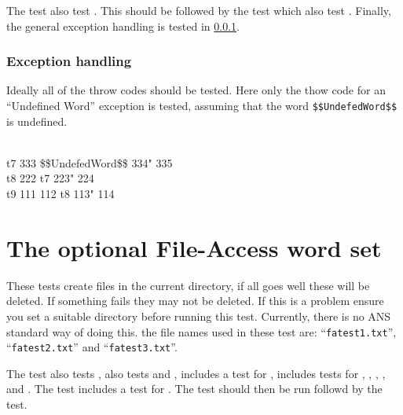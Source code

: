 The test  also test .  This should
be followed by the test  which also test
.  Finally, the general exception handling is tested in
\ref{test:throw}.

\setcounter{subsection}{3}
\setcounter{subsubsection}{5}
\subsubsection{Exception handling}
\label{test:throw}

Ideally all of the throw codes should be tested.  Here only the
thow code for an ``Undefined Word'' exception is tested, assuming
that the word \texttt{\$\$UndefedWord\$\$} is undefined.

\begin{tt}
 \\
\word{:} t7  333 \$\$UndefedWord\$\$ 334"  335 \word{;} \\
\word{:} t8  222 t7 223"  224 \word{;} \\
\word{:} t9  111 112 t8 113"  114 \word{;}
\end{tt}






\section{The optional File-Access word set} %

These tests create files in the current directory, if all goes well
these will be deleted.  If something fails they may not be deleted.
If this is a problem ensure you set a suitable directory before
running this test.  Currently, there is no ANS standard way of doing
this.  the file names used in these test are:
``\texttt{fatest1.txt}'', ``\texttt{fatest2.txt}'' and
``\texttt{fatest3.txt}''.

The test  also tests ,
 \linebreak also tests  and ,
 includes a test for ,
 includes tests for ,
, , , and
.
The  test includes a test for .
The test  should then be run followd by
the  test.

